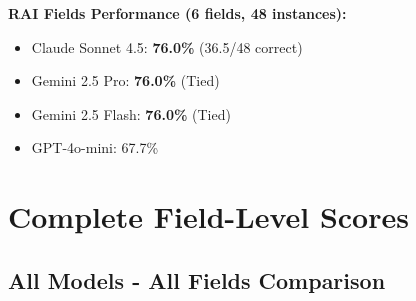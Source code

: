 \documentclass[11pt,a4paper]{article}
\begin{document}
\textbf{RAI Fields Performance (6 fields, 48 instances):}
\begin{itemize}[leftmargin=*]
    \item Claude Sonnet 4.5: \textbf{76.0\%} (36.5/48 correct)
    \item Gemini 2.5 Pro: \textbf{76.0\%} (Tied)
    \item Gemini 2.5 Flash: \textbf{76.0\%} (Tied)
    \item GPT-4o-mini: 67.7\%
\end{itemize}

\section{Complete Field-Level Scores}

\subsection{All Models - All Fields Comparison}
\end{document}
